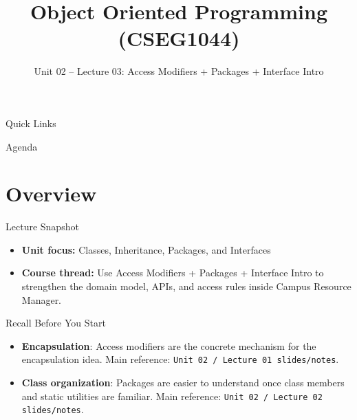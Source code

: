 \documentclass{beamer}
\title[OOPS with Java]{Object Oriented Programming (CSEG1044)}
\subtitle{Unit 02 -- Lecture 03: Access Modifiers + Packages + Interface Intro}
\begin{document}
\begin{frame}[fragile]
  \titlepage
  \vspace{0.5em}
  \slidesources{\OOPSUnitIISources}
\end{frame}

\begin{frame}{Quick Links}
  \centering
  \hyperlink{sec:overview}{}\hspace{0.6em}
  \hyperlink{sec:concepts}{}\hspace{0.6em}
  \hyperlink{sec:demo}{}\hspace{0.6em}
  \hyperlink{sec:summary}{}
  \slidesources{\OOPSUnitIISources}
\end{frame}

\begin{frame}{Agenda}
  \tableofcontents
  \slidesources{\OOPSUnitIISources}
\end{frame}

\section{Overview}
\label{sec:overview}

\begin{frame}{Lecture Snapshot}
\begin{itemize}[<+->]
  \item \textbf{Unit focus:} Classes, Inheritance, Packages, and Interfaces
  \item \textbf{Course thread:} Use Access Modifiers + Packages + Interface Intro to strengthen the domain model, APIs, and access rules inside Campus Resource Manager.
\end{itemize}
  \slidesources{\OOPSUnitIISources}
\end{frame}

\begin{frame}{Recall Before You Start}
\begin{itemize}[<+->]
  \item \textbf{Encapsulation}: Access modifiers are the concrete mechanism for the encapsulation idea. Main reference: \texttt{Unit 02 / Lecture 01 slides/notes}.
  \item \textbf{Class organization}: Packages are easier to understand once class members and static utilities are familiar. Main reference: \texttt{Unit 02 / Lecture 02 slides/notes}.
\end{itemize}
  \slidesources{\OOPSUnitIISources}
\end{frame}
\end{document}
